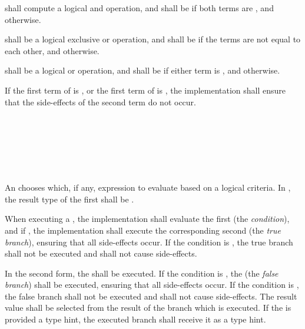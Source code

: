 \specsubsubitem
\terminal{\&\&} shall compute a logical and operation, and shall be
 if both terms are , and 
otherwise.

\specsubsubitem
\terminal{\textasciicircum\textasciicircum} shall be a logical exclusive or
operation, and shall be  if the terms are not equal to each
other, and  otherwise.

\specsubsubitem
\terminal{||} shall be a logical or operation, and shall be  if
either term is , and  otherwise.

\specsubsubitem
If the first term of  is ,
or the first term of  is ,
the implementation shall ensure that the side-effects of the second term do not
occur.


\begin{grammar}
 \\
	  \\
	    \\

 \\
	\terminal{(}  \terminal{)}  \\
\end{grammar}

\specsubsubitem
An  chooses which, if any, expression to evaluate
based on a logical criteria. In , the result type of
the first  shall be .

\specsubsubitem
When executing a , the implementation shall
evaluate the first  (the \textit{condition}), and if
, the implementation shall execute the corresponding second
 (the \textit{true branch}), ensuring that all
side-effects occur. If the condition is , the true branch shall
not be executed and shall not cause side-effects.

\specsubsubitem
In the second form, the  shall be executed. If
the condition is , the  (the
\textit{false branch}) shall be executed, ensuring that all side-effects occur.
If the condition is , the false branch shall not be executed and
shall not cause side-effects. The result value shall be selected from the result
of the branch which is executed. If the  is provided
a type hint, the executed branch shall receive it as a type hint.

